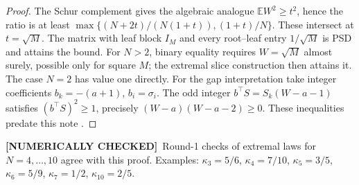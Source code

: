 \documentclass[11pt]{article}
\theoremstyle{definition}
\newcommand{\E}{\mathbb E}
\newcommand{\1}{\mathbf 1}
\newcommand{\nc}{\textbf{[NUMERICALLY CHECKED]}}
\begin{document}
\begin{proof}
The Schur complement gives the algebraic analogue $\E W^2\ge t^2$, hence
the ratio is at least
$\max\{(N+2t)/(N(1+t)),(1+t)/N\}$.
These intersect at $t=\sqrt M$. The matrix with leaf block $I_M$ and every
root--leaf entry $1/\sqrt M$ is PSD and attains the bound.
For $N>2$, binary equality requires $W=\sqrt M$ almost surely, possible only
for square $M$; the extremal slice construction then attains it.
The case $N=2$ has value one directly.
For the gap interpretation take integer coefficients $b_k=-(a+1)$,
$b_i=\sigma_i$. The odd integer $b^\top S=S_k(W-a-1)$ satisfies
$(b^\top S)^2\ge1$, precisely $(W-a)(W-a-2)\ge0$.
These inequalities predate this note \cite{gap}.
\end{proof}
\nc\ Round-1 checks of extremal laws for $N=4,\ldots,10$ agree with this proof.
Examples: $\kappa_3=5/6$, $\kappa_4=7/10$, $\kappa_5=3/5$,
$\kappa_6=5/9$, $\kappa_7=1/2$, $\kappa_{10}=2/5$.
\end{document}

